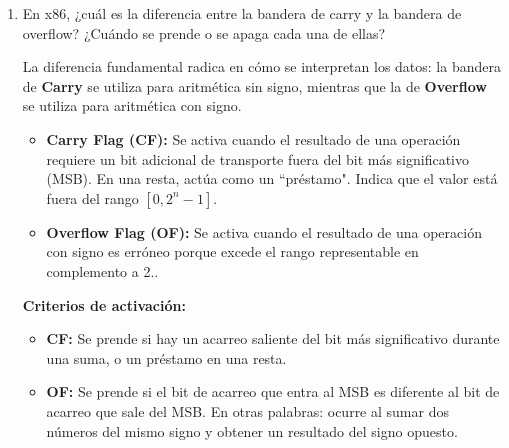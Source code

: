 \documentclass[a4paper, 11pt]{article}
\newcommand{\Pspace}{0.5cm}
\newcommand{\Aspace}{0.2cm}
\begin{document}
\begin{enumerate}
    \vspace{\Pspace}
    \item En x86, ¿cuál es la diferencia entre la bandera de carry y la bandera de overflow? ¿Cuándo se prende o se apaga cada una de ellas? \par
        \vspace{\Aspace} \par
        { \color{azul}  
            La diferencia fundamental radica en cómo se interpretan los datos: la bandera de \textbf{Carry} se utiliza para aritmética sin signo, mientras que la de \textbf{Overflow} se utiliza para aritmética con signo.

            \begin{itemize}
                \item \textbf{Carry Flag (CF):} Se activa cuando el resultado de una operación requiere un bit adicional de transporte fuera del bit más significativo (MSB). En una resta, actúa como un ``préstamo". Indica que el valor está fuera del rango $[0, 2^n - 1]$.
                \item \textbf{Overflow Flag (OF):} Se activa cuando el resultado de una operación con signo es erróneo porque excede el rango representable en complemento a 2..
            \end{itemize}

            \textbf{Criterios de activación:}
            \begin{itemize}
                \item \textbf{CF:} Se prende si hay un acarreo saliente del bit más significativo durante una suma, o un préstamo en una resta.
                \item \textbf{OF:} Se prende si el bit de acarreo que entra al MSB es diferente al bit de acarreo que sale del MSB. En otras palabras: ocurre al sumar dos números del mismo signo y obtener un resultado del signo opuesto.
            \end{itemize}
        }




\end{enumerate}
\end{document}

